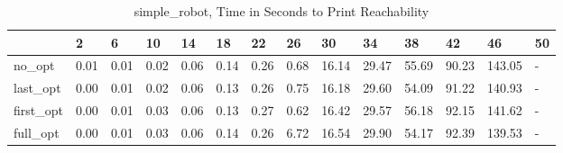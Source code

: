 \begin{table}
\caption{simple_robot, Time in Seconds to Print Reachability}
\label{simple_robot_states_time}
\begin{tabular}{llllllllllllll}
\toprule
 & 2 & 6 & 10 & 14 & 18 & 22 & 26 & 30 & 34 & 38 & 42 & 46 & 50 \\
\midrule
no_opt & 0.01 & 0.01 & 0.02 & 0.06 & 0.14 & 0.26 & 0.68 & 16.14 & 29.47 & 55.69 & 90.23 & 143.05 & - \\
last_opt & 0.00 & 0.01 & 0.02 & 0.06 & 0.13 & 0.26 & 0.75 & 16.18 & 29.60 & 54.09 & 91.22 & 140.93 & - \\
first_opt & 0.00 & 0.01 & 0.03 & 0.06 & 0.13 & 0.27 & 0.62 & 16.42 & 29.57 & 56.18 & 92.15 & 141.62 & - \\
full_opt & 0.00 & 0.01 & 0.03 & 0.06 & 0.14 & 0.26 & 6.72 & 16.54 & 29.90 & 54.17 & 92.39 & 139.53 & - \\
\bottomrule
\end{tabular}
\end{table}
